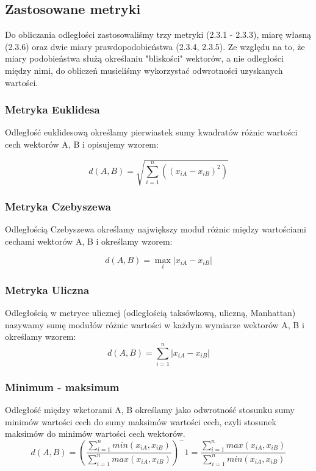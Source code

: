 \documentclass{classrep}
\begin{document}
\subsection{Zastosowane metryki}
Do obliczania odległości zastosowaliśmy trzy metryki (2.3.1 - 2.3.3), miarę własną (2.3.6) oraz dwie miary prawdopodobieństwa (2.3.4, 2.3.5). Ze względu na to, że miary podobieństwa służą określaniu "bliskości" wektorów, a nie odległości między nimi, do obliczeń musieliśmy wykorzystać odwrotności uzyskanych wartości. 
\subsubsection{Metryka Euklidesa}
Odległość euklidesową określamy pierwiastek sumy kwadratów różnic wartości cech wektorów A, B i opisujemy wzorem:

\begin{equation}
d(A, B) =  \sqrt{\sum_{i=1}^n((x_{iA} - x_{iB})^2)}
\end{equation}

\subsubsection{Metryka Czebyszewa}
Odległością Czebyszewa określamy największy moduł różnic między wartościami cechami wektorów A, B i określamy wzorem:

\begin{equation}
d(A, B) =  \mathop{max}_{i}|x_{iA} - x_{iB}|
\end{equation}

\subsubsection{Metryka Uliczna}
Odległością w metryce ulicznej (odległością taksówkową, uliczną, Manhattan) nazywamy sumę modułów różnic wartości w każdym wymiarze wektorów A, B i określamy wzorem:
\begin{equation}
d(A, B) =  \sum_{i=1}^n|x_{iA} - x_{iB}|
\end{equation}
\subsubsection{Minimum - maksimum}
Odległość między wketorami A, B określamy jako odwrotność stosunku sumy minimów wartości cech do sumy maksimów wartości cech, czyli stosunek maksimów do minimów wartości cech wektorów.
\begin{equation}
d(A, B) = (\frac{\sum_{i=1}^n{min(x_{iA}, x_{iB})}}{\sum_{i=1}^n{max(x_{iA}, x_{iB})}})^-1 = \frac{\sum_{i=1}^n{max(x_{iA}, x_{iB})}}{\sum_{i=1}^n{min(x_{iA}, x_{iB})}}
\end{equation}
\end{document}
